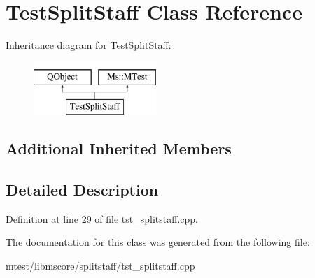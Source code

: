 \hypertarget{class_test_split_staff}{}\section{Test\+Split\+Staff Class Reference}
\label{class_test_split_staff}
Inheritance diagram for Test\+Split\+Staff\+:\begin{figure}[H]
\begin{center}
\leavevmode
\includegraphics[height=2.000000cm]{class_test_split_staff}
\end{center}
\end{figure}
\subsection*{Additional Inherited Members}


\subsection{Detailed Description}


Definition at line 29 of file tst\+\_\+splitstaff.\+cpp.



The documentation for this class was generated from the following file\+:\begin{DoxyCompactItemize}
\item 
mtest/libmscore/splitstaff/tst\+\_\+splitstaff.\+cpp\end{DoxyCompactItemize}
